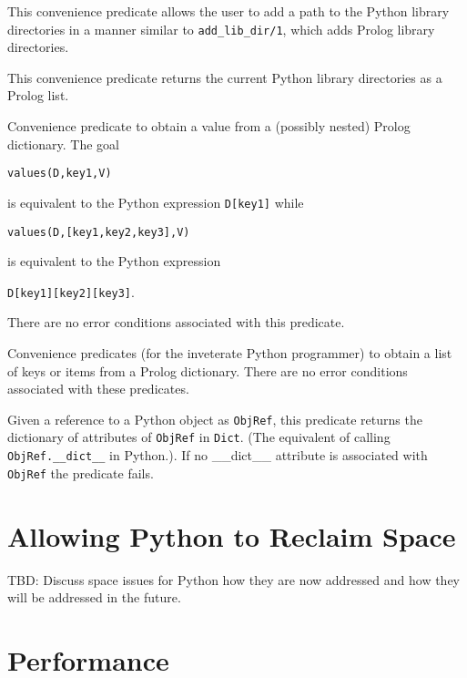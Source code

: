 \begin{description}
%
This convenience predicate allows the user to add a path to the Python
library directories in a manner similar to {\tt add\_lib\_dir/1},
which adds Prolog library directories.

%
This convenience predicate returns the current Python library
directories as a Prolog list.

%
  Convenience predicate to obtain a value from a (possibly nested)
  Prolog dictionary.  The goal

  {\tt values(D,key1,V)}

\noindent
  is equivalent to the
  Python expression {\tt D[key1]} while

  {\tt values(D,[key1,key2,key3],V)}

\noindent
is equivalent to the Python expression

{\tt D[key1][key2][key3]}.

There are no error conditions associated with this predicate.

%
Convenience predicates (for the inveterate Python programmer) to
obtain a list of keys or items from a Prolog dictionary.  There are no
error conditions associated with these predicates.



%
Given a reference to a Python object as {\tt ObjRef}, this predicate
returns the dictionary of attributes of {\tt ObjRef} in {\tt Dict}.
(The equivalent of calling {\tt ObjRef.\_\_dict\_\_} in Python.).  If
no \_\_dict\_\_ attribute is associated with {\tt ObjRef} the
predicate fails.

\end{description}

\section{Allowing Python to Reclaim Space}
%
TBD: Discuss space issues for Python how they are now addressed and
how they will be addressed in the future.

\section{Performance}


